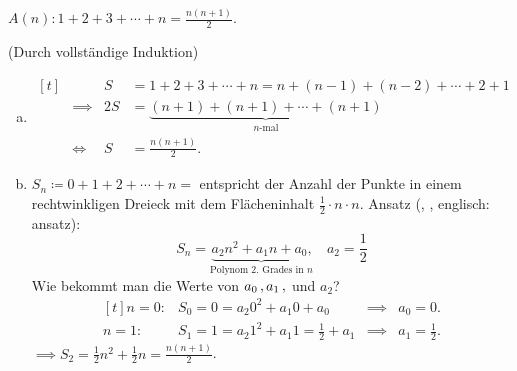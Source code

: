 \documentclass[../ana1.tex]{subfiles}
\begin{document}
\begin{bsp}
	\(A(n): 1+2+3+\cdots+n = \frac{n(n+1)}{2} \).
	\begin{bew} (Durch vollständige Induktion)
	\end{bew}
\end{bsp}
\begin{bem}\label{satz:summenformel}\leavevmode
	\begin{enumerate}[(a)]
		\item \(\begin{aligned}[t]
					&	         		 & S &= 1 + 2 + 3 + \cdots + n = n + (n-1)+ (n-2) + \cdots + 2 + 1\\
					&\implies 		     &2S &= \underbrace{(n+1)+(n+1)+\cdots+(n+1)}_{n\text{-mal}}\\
					&\Longleftrightarrow & S &= \frac{n(n+1)}{2}.
			    \end{aligned} \)
		\item \( S_{n} \coloneqq 0 + 1 + 2 + \cdots + n = \) entspricht der Anzahl der Punkte in einem 
			  rechtwinkligen Dreieck mit dem Flächeninhalt \(\frac{1}{2}\cdot n \cdot n \).\newline
			  Ansatz (, , englisch: ansatz):
			  \[S_{n} = \underbrace{a_{2}n^{2} + a_{1}n + a_{0}\text{,}}_{\text{Polynom }2\text{. Grades in }n}\quad a_{2} = \frac{1}{2}\]
			  Wie bekommt man die Werte von \(a_0 \operatorname{,} a_1 \operatorname{,} \) und \(a_2\)?
			  \[\begin{aligned}[t]
					n=0\colon& S_{0} = 0 = a_{2}0^{2} + a_{1}0 + a_{0}               &\implies& a_{0} = 0.\\ 
					n=1\colon& S_{1} = 1 = a_{2}1^{2} + a_{1}1 = \frac{1}{2} + a_{1} &\implies& a_{1} = \frac{1}{2}.
			    \end{aligned}\]
			  \(\implies S_{2} = \frac{1}{2}n^{2} + \frac{1}{2}n = \frac{n(n+1)}{2} \).
	\end{enumerate}
\end{bem}

\iftoggle{short}{}{\newpage}%
\end{document}
